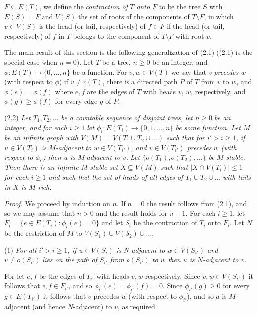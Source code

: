 \noindent $F \subseteq E(T)$, we define the \textit{contraction of $T$ onto $F$} to be the tree $S$ with $E(S) = F$ and $V(S)$ the set of roots of the components of $T\setminus F$, in which $v \in V(S)$ is the head (or tail, respectively) of $f \in F$ if the head (or tail, respectively) of $f$ in $T$ belongs to the component of $T\setminus F$ with root $v$.

The main result of this section is the following generalization of (2.1) ((2.1) is the special case when $n = 0$). Let $T$ be a tree, $n \ge 0$ be an integer, and $\phi: E(T) \to \{0, \dots, n\}$ be a function. For $v, w \in V(T)$ we say that $v$ \textit{precedes} $w$ (with respect to $\phi$) if $v \ne o(T)$, there is a directed path $P$ of $T$ from $v$ to $w$, and $\phi(e) = \phi(f)$ where $e, f$ are the edges of $T$ with heads $v$, $w$, respectively, and $\phi(g) \ge \phi(f)$ for every edge $g$ of $P$.

\stmt
(2.2) \textit{Let $T_1, T_2, \dots$ be a countable sequence of disjoint trees, let $n \ge 0$ be an integer, and for each $i \ge 1$ let $\phi_i: E(T_i) \to \{0, 1, \dots, n\}$ be some function. Let $M$ be an infinite graph with $V(M) = V(T_1 \cup T_2 \cup \dots)$ such that for $i' > i \ge 1$, if $u \in V(T_i)$ is $M$-adjacent to $w \in V(T_{i'})$, and $v \in V(T_{i'})$ precedes $w$ (with respect to $\phi_{i'}$) then $u$ is $M$-adjacent to $v$. Let $\{o(T_1), o(T_2), \dots\}$ be $M$-stable. Then there is an infinite $M$-stable set $X \subseteq V(M)$ such that $|X \cap V(T_i)| \le 1$ for each $i \ge 1$ and such that the set of heads of all edges of $T_1 \cup T_2 \cup \dots$ with tails in $X$ is $M$-rich.}

\textit{Proof.} We proceed by induction on $n$. If $n = 0$ the result follows from (2.1), and so we may assume that $n > 0$ and the result holds for $n - 1$. For each $i \ge 1$, let $F_i = \{e \in E(T_i): \phi_i(e) = 0\}$ and let $S_i$ be the contraction of $T_i$ onto $F_i$. Let $N$ be the restriction of $M$ to $V(S_1) \cup V(S_2) \cup \dots$.

\hspace*{12pt}(1) \textit{For all $i' > i \ge 1$, if $u \in V(S_i)$ is $N$-adjacent to $w \in V(S_{i'})$ and $v \ne o(S_{i'})$ lies on the path of $S_{i'}$ from $o(S_{i'})$ to $w$ then $u$ is $N$-adjacent to $v$.}

For let $e, f$ be the edges of $T_{i'}$ with heads $v, w$ respectively. Since $v, w \in V(S_{i'})$ it follows that $e, f \in F_{i'}$, and so $\phi_{i'}(e) = \phi_{i'}(f) = 0$. Since $\phi_{i'}(g) \ge 0$ for every $g \in E(T_{i'})$ it follows that $v$ precedes $w$ (with respect to $\phi_{i'}$), and so $u$ is $M$-adjacent (and hence $N$-adjacent) to $v$, as required.

